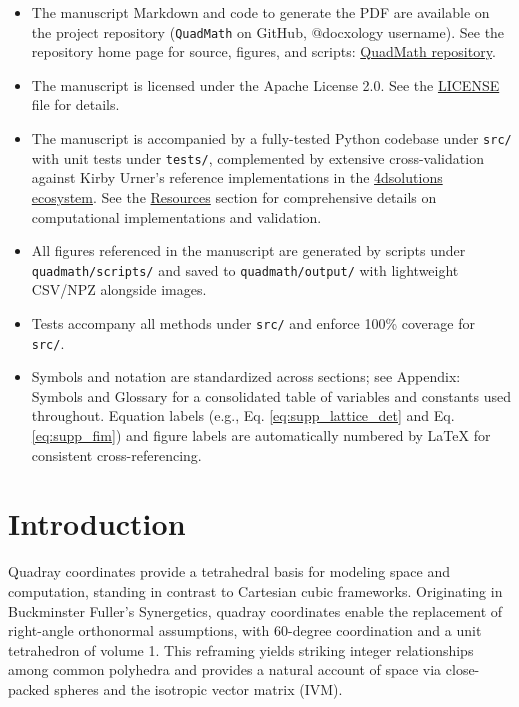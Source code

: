 \documentclass[
  10pt,
]{article}
\newcommand{\passthrough}[1]{#1}
\providecommand{\tightlist}{%
  \setlength{\itemsep}{0pt}\setlength{\parskip}{0pt}}
\begin{document}
\begin{itemize}
\tightlist
\item
  The manuscript Markdown and code to generate the PDF are available on
  the project repository (\passthrough{\lstinline!QuadMath!} on GitHub,
  @docxology username). See the repository home page for source,
  figures, and scripts:
  \href{https://github.com/docxology/quadmath}{QuadMath repository}.
\item
  The manuscript is licensed under the Apache License 2.0. See the
  \href{../LICENSE}{LICENSE} file for details.
\item
  The manuscript is accompanied by a fully-tested Python codebase under
  \passthrough{\lstinline!src/!} with unit tests under
  \passthrough{\lstinline!tests/!}, complemented by extensive
  cross-validation against Kirby Urner's reference implementations in
  the \href{https://github.com/4dsolutions}{4dsolutions ecosystem}. See
  the \href{07_resources.md}{Resources} section for comprehensive
  details on computational implementations and validation.
\item
  All figures referenced in the manuscript are generated by scripts
  under \passthrough{\lstinline!quadmath/scripts/!} and saved to
  \passthrough{\lstinline!quadmath/output/!} with lightweight CSV/NPZ
  alongside images.
\item
  Tests accompany all methods under \passthrough{\lstinline!src/!} and
  enforce 100\% coverage for \passthrough{\lstinline!src/!}.
\item
  Symbols and notation are standardized across sections; see Appendix:
  Symbols and Glossary for a consolidated table of variables and
  constants used throughout. Equation labels (e.g., Eq.
  \eqref{eq:supp_lattice_det} and Eq. \eqref{eq:supp_fim}) and figure
  labels are automatically numbered by LaTeX for consistent
  cross-referencing. 
\end{itemize}

\hypertarget{introduction}{%
\section{Introduction}\label{introduction}}

Quadray coordinates provide a tetrahedral basis for modeling space and
computation, standing in contrast to Cartesian cubic frameworks.
Originating in Buckminster Fuller's Synergetics, quadray coordinates
enable the replacement of right-angle orthonormal assumptions, with
60-degree coordination and a unit tetrahedron of volume 1. This
reframing yields striking integer relationships among common polyhedra
and provides a natural account of space via close-packed spheres and the
isotropic vector matrix (IVM).
\end{document}
